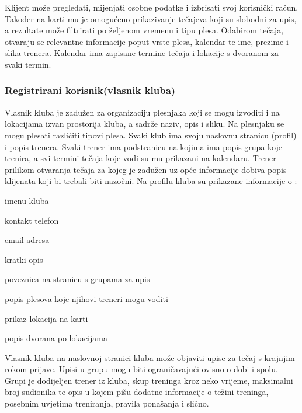 			
		Klijent može pregledati, mijenjati osobne podatke i izbrisati svoj korisnički račun. Također na karti mu je omogućeno prikazivanje tečajeva koji su slobodni za upis, a rezultate može filtrirati po željenom vremenu i tipu plesa. 
		Odabirom tečaja, otvaraju se relevantne informacije poput vrste plesa, kalendar te ime, prezime i slika trenera. Kalendar ima zapisane termine tečaja i lokacije s dvoranom za svaki termin.
		

			
			\subsubsection{Registrirani korisnik(vlasnik kluba)}
			Vlasnik kluba je zadužen za organizaciju plesnjaka koji se mogu izvoditi i na lokacijama izvan prostorija kluba, a sadrže naziv, opis i sliku. Na plesnjaku se mogu plesati različiti tipovi plesa. Svaki klub ima svoju naslovnu stranicu (profil) i popis trenera.
			Svaki trener ima podstranicu na kojima ima popis grupa koje trenira, a svi termini tečaja koje vodi su mu prikazani na kalendaru. Trener prilikom otvaranja tečaja za kojeg je zadužen uz opće informacije dobiva popis klijenata koji bi trebali biti nazočni.
			Na profilu kluba su prikazane informacije o :
			
			
			
			\begin{packed_item}
				\item imenu kluba
				\item kontakt telefon
				\item email adresa
				\item kratki opis
				\item poveznica na stranicu s grupama za upis
				\item popis plesova koje njihovi treneri mogu voditi
				\item prikaz lokacija na karti
				\item popis dvorana po lokacijama
			\end{packed_item}
		
		Vlasnik kluba na naslovnoj stranici kluba može objaviti upise za tečaj s krajnjim rokom prijave. Upisi u grupu mogu biti ograničavajući ovisno o dobi i spolu. Grupi je dodijeljen trener iz kluba, skup treninga kroz neko vrijeme, maksimalni broj sudionika te opis u kojem pišu dodatne informacije o težini treninga, posebnim uvjetima treniranja, pravila ponašanja i slično.
		
			\bigskip
			\bigskip
			\bigskip
			\bigskip
			\bigskip
			
